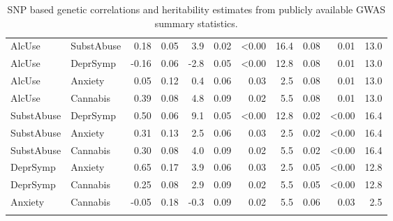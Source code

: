 {\begin{longtable}{llrrrrrrrrr}
AlcUse & SubstAbuse & 0.18 & 0.05 & 3.9 & 0.02 & \textless 0.00 & 16.4 & 0.08 & 0.01 & 13.0 \\ 
AlcUse & DeprSymp & -0.16 & 0.06 & -2.8 & 0.05 & \textless 0.00 & 12.8 & 0.08 & 0.01 & 13.0 \\ 
AlcUse & Anxiety & 0.05 & 0.12 & 0.4 & 0.06 & 0.03 & 2.5 & 0.08 & 0.01 & 13.0 \\ 
AlcUse & Cannabis & 0.39 & 0.08 & 4.8 & 0.09 & 0.02 & 5.5 & 0.08 & 0.01 & 13.0 \\ 
SubstAbuse & DeprSymp & 0.50 & 0.06 & 9.1 & 0.05 & \textless 0.00 & 12.8 & 0.02 & \textless 0.00 & 16.4 \\ 
SubstAbuse & Anxiety & 0.31 & 0.13 & 2.5 & 0.06 & 0.03 & 2.5 & 0.02 & \textless 0.00 & 16.4 \\ 
SubstAbuse & Cannabis & 0.30 & 0.08 & 4.0 & 0.09 & 0.02 & 5.5 & 0.02 & \textless 0.00 & 16.4 \\ 
DeprSymp & Anxiety & 0.65 & 0.17 & 3.9 & 0.06 & 0.03 & 2.5 & 0.05 & \textless 0.00 & 12.8 \\ 
DeprSymp & Cannabis & 0.25 & 0.08 & 2.9 & 0.09 & 0.02 & 5.5 & 0.05 & \textless 0.00 & 12.8 \\ 
Anxiety & Cannabis & -0.05 & 0.18 & -0.3 & 0.09 & 0.02 & 5.5 & 0.06 & 0.03 & 2.5 \\ 
  \hline
\caption{SNP based genetic correlations and heritability estimates from publicly available GWAS summary statistics.} 
\label{tab:rg}
\end{longtable}
\renewcommand{\arraystretch}{1}
}